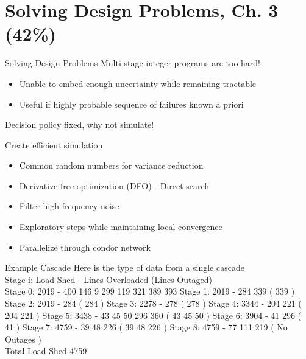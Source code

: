 \section{Solving Design Problems, Ch. 3 \hfill (42\%)}
\frame{\tableofcontents[currentsection,subsubsectionstyle=hide]}
\begin{frame}{Solving Design Problems}
\alert{Multi-stage integer programs are too hard!}
\pause
\begin{itemize}
\item Unable to embed enough uncertainty while remaining tractable
\item Useful if highly probable sequence of failures known a priori
\end{itemize}
\pause

\alert{Decision policy fixed, why not simulate!}

Create efficient simulation
\begin{itemize}
\item Common random numbers for variance reduction
\item Derivative free optimization (DFO) - Direct search
\bi
\item Filter high frequency noise
\item Exploratory steps while maintaining local convergence
\ei
\item Parallelize through condor network
\end{itemize}
\end{frame}


\begin{frame}{Example Cascade}
Here is the type of data from a single cascade \newline \\
Stage i:  Load Shed - Lines Overloaded (Lines Outaged) \newline \\
Stage 0: 2019 -  400  146  9  299  119  321  389  393  \newline
Stage 1: 2019 -  284  339 ( 339  )  \newline
Stage 2: 2019 -  284 ( 284  ) \newline
Stage 3: 2278 -  278 ( 278  ) \newline
Stage 4: 3344 -  204  221 ( 204  221  ) \newline
Stage 5: 3438 -  43  45  50  296  360 ( 43  45  50  ) \newline
Stage 6: 3904 -  41  296 ( 41  ) \newline
Stage 7: 4759 -  39  48  226 ( 39  48  226  ) \newline
Stage 8: 4759 -  77  111  219 ( No Outages ) \newline \\
Total Load Shed 4759
\end{frame}

